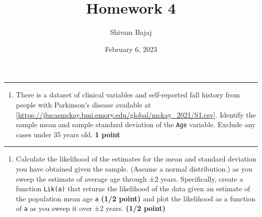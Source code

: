 \documentclass[
]{article}
\title{Homework 4}
\author{Shivam Bajaj}
\date{February 6, 2023}
\newenvironment{Shaded}{\begin{snugshade}}{\end{snugshade}}
\newcommand{\DecValTok}[1]{\textcolor[rgb]{0.00,0.00,0.81}{#1}}
\newcommand{\DocumentationTok}[1]{\textcolor[rgb]{0.56,0.35,0.01}{\textbf{\textit{#1}}}}
\newcommand{\FunctionTok}[1]{\textcolor[rgb]{0.00,0.00,0.00}{#1}}
\newcommand{\NormalTok}[1]{#1}
\newcommand{\OtherTok}[1]{\textcolor[rgb]{0.56,0.35,0.01}{#1}}
\newcommand{\SpecialCharTok}[1]{\textcolor[rgb]{0.00,0.00,0.00}{#1}}
\newcommand{\StringTok}[1]{\textcolor[rgb]{0.31,0.60,0.02}{#1}}
\providecommand{\tightlist}{%
  \setlength{\itemsep}{0pt}\setlength{\parskip}{0pt}}
\begin{document}
\maketitle

\begin{center}\rule{0.5\linewidth}{0.5pt}\end{center}

\begin{enumerate}
\def\labelenumi{\arabic{enumi}.}
\tightlist
\item
  There is a dataset of clinical variables and self-reported fall
  history from people with Parkinson's disease available at
  {[}\url{https://jlucasmckay.bmi.emory.edu/global/mckay_2021/S1.csv}{]}.
  Identify the sample mean and sample standard deviation of the
  \texttt{Age} variable. Exclude any cases under 35 years old. \textbf{1
  point}
\end{enumerate}

\begin{Shaded}
\end{Shaded}

\begin{center}\rule{0.5\linewidth}{0.5pt}\end{center}

\begin{enumerate}
\def\labelenumi{\arabic{enumi}.}
\setcounter{enumi}{1}
\tightlist
\item
  Calculate the likelihood of the estimates for the mean and standard
  deviation you have obtained given the sample. (Assume a normal
  distribution.) as you sweep the estimate of average age through ±2
  years. Specifically, create a function \texttt{Lik(a)} that returns
  the likelihood of the data given an estimate of the population mean
  age \texttt{a} \textbf{(1/2 point)} and plot the likelihood as a
  function of \texttt{a} as you sweep it over ±2 years. \textbf{(1/2
  point)}
\end{enumerate}
\end{document}
